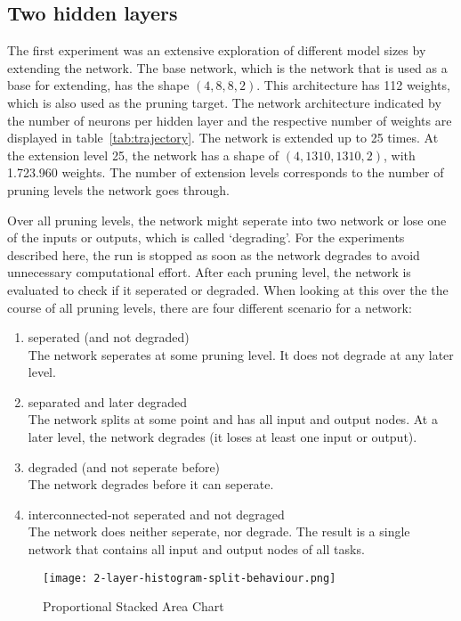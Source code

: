 \subsection{Two hidden layers}\label{two-hidden}
The first experiment was an extensive exploration of different model sizes by extending the network.
The base network, which is the network that is used as a base for extending, has the shape $(4,8,8,2)$.
This architecture has 112 weights, which is also used as the pruning target.
The network architecture indicated by the number of neurons per hidden layer and the respective number of weights are displayed in table~\ref{tab:trajectory}.
The network is extended up to 25 times.
At the extension level 25, the network has a shape of $(4,1310,1310,2)$, with 1.723.960 weights.
The number of extension levels corresponds to the number of pruning levels the network goes through.

Over all pruning levels, the network might seperate into two network or lose one of the inputs or outputs, which is called `degrading'.
For the experiments described here, the run is stopped as soon as the network degrades to avoid unnecessary computational effort.
After each pruning level, the network is evaluated to check if it seperated or degraded.
When looking at this over the the course of all pruning levels, there are four different scenario for a network:

\begin{enumerate}
    \item seperated (and not degraded)\\
    The network seperates at some pruning level. 
    It does not degrade at any later level. 
    \item separated and later degraded \\
    The network splits at some point and has all input and output nodes.
    At a later level, the network degrades (it loses at least one input or output).
    \item degraded (and not seperate before) \\
    The network degrades before it can seperate.
    \item interconnected-not seperated and not degraged \\
    The network does neither seperate, nor degrade. 
    The result is a single network that contains all input and output nodes of all tasks.
\end{enumerate}

\begin{figure}[ht]
    \centering
    \texttt{[image: 2-layer-histogram-split-behaviour.png]}
    \caption{
        Proportional Stacked Area Chart
        }\label{fig:2laxer-histogram}
\end{figure}

